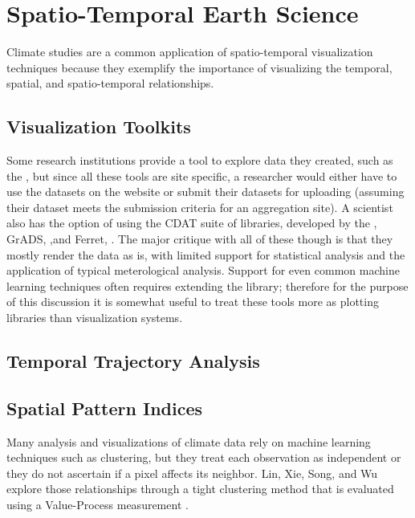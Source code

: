 \documentclass[letterpaper,onecolumn,titlepage]{Ythesis}
\begin{document}
\section{Spatio-Temporal Earth Science}
\label{sec:climate}
Climate studies are a common application of spatio-temporal visualization techniques because they exemplify the importance of visualizing the temporal, spatial, and spatio-temporal relationships. 

\subsection{Visualization Toolkits}
Some research institutions provide a tool to explore data they created, such as the \cite{src:esrlpsd}, but since all these tools are site specific, a researcher would either have to use the datasets on the website or submit their datasets for uploading 
(assuming their dataset meets the submission criteria for an aggregation site). A scientist also has the option of using the CDAT suite of libraries, developed by the \cite{WilliamsEtAl13}, GrADS, \cite{src:grads},and Ferret, \cite{src:HankinEtAl96}. The major critique with all of these though is that they mostly render the data as is, with limited support for statistical analysis and the application of typical meterological analysis. Support for even common machine learning techniques often requires extending the library; therefore for the purpose of this discussion it is somewhat useful to treat these tools more as plotting libraries than visualization systems. %


\subsection{Temporal Trajectory Analysis}
\subsection{Spatial Pattern Indices}

Many analysis and visualizations of climate data rely on machine learning techniques such as clustering, but they treat each observation as independent or they do not ascertain if a pixel affects its neighbor. Lin, Xie, Song, and Wu explore those relationships through a tight clustering method that is evaluated using a Value-Process measurement  \cite{LinXieSongWu09}. 
\end{document}
